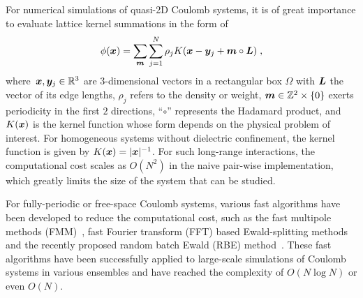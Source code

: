 
For numerical simulations of quasi-2D Coulomb systems, it is of great importance to evaluate lattice kernel summations in the form of
\begin{equation}\label{eq::phi12}
	\phi(\boldsymbol{x}) = \sum_{\boldsymbol{m}} \sum_{j = 1}^{N} \rho_j K(\boldsymbol{x} - \boldsymbol{y}_j + \boldsymbol{m} \circ \boldsymbol{L})\;,
\end{equation}
where~$\boldsymbol{x}, \boldsymbol{y}_j \in \mathbb{R}^3$ are $3$-dimensional vectors in a rectangular box $\Omega$ with $\boldsymbol{L}$ the vector of its edge lengths, $\rho_j$ refers to the density or weight, $\boldsymbol{m} \in \mathbb{Z}^2 \times \{0\}$ exerts periodicity in the first $2$ directions, ``$\circ$'' represents the Hadamard product, and~$K(\boldsymbol{x})$ is the kernel function whose form depends on the physical problem of interest. 
For homogeneous systems without dielectric confinement, the kernel function is given by $K(\boldsymbol{x}) = \lvert\boldsymbol{x}\rvert^{-1}$.
For such long-range interactions, the computational cost scales as $O(N^2)$ in the naive pair-wise implementation, which greatly limits the size of the system that can be studied.


For fully-periodic or free-space Coulomb systems, various fast algorithms have been developed to reduce the computational cost, such as the fast multipole methods (FMM)~\cite{greengard1987fast,cheng1999fast,ying2004kernel}, fast Fourier transform (FFT) based Ewald-splitting methods~\cite{hockney2021computer,darden1993particle,essmann1995smooth} and the recently proposed random batch Ewald (RBE) method~\cite{jin2021random, liang2022superscalability,liang2024JCP}.
These fast algorithms have been successfully applied to large-scale simulations of Coulomb systems in various ensembles and have reached the complexity of $O(N\log N)$ or even $O(N)$.
 
